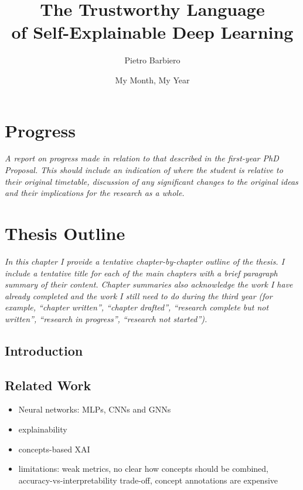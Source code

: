 \documentclass[withindex,glossary,secondyr]{cam-thesis}
\title{The Trustworthy Language\\of Self-Explainable Deep Learning}
\author{Pietro Barbiero}
\date{My Month, My Year}
\begin{document}
\frontmatter{}



\chapter{Progress}
\textit{A report on progress made in relation to that described in the first-year PhD Proposal. This should include an indication of where the student is relative to their original timetable, discussion of any significant changes to the original ideas and their implications for the research as a whole.}

\chapter{Thesis Outline}
\textit{In this chapter I provide a tentative chapter-by-chapter outline of the thesis. I include a tentative title for each of the main chapters with a brief paragraph summary of their content. Chapter summaries also acknowledge the work I have already completed and the work I still need to do during the third year (for example, ``chapter written'', ``chapter drafted'', ``research complete but not written'', ``research in progress'', ``research not started'').}

\section{Introduction}

\section{Related Work}
\begin{itemize}
    \item Neural networks: MLPs, CNNs and GNNs
    \item explainability~\citep{duran2021afraid,lo2020ethical,wachter2017counterfactual,gdpr2017,rudin2019stop}
    \item concepts-based XAI~\citep{ghorbani2019towards,kim2018interpretability,shen2022trust}
    \item limitations: weak metrics, no clear how concepts should be combined, accuracy-vs-interpretability trade-off, concept annotations are expensive
\end{itemize}
\end{document}
